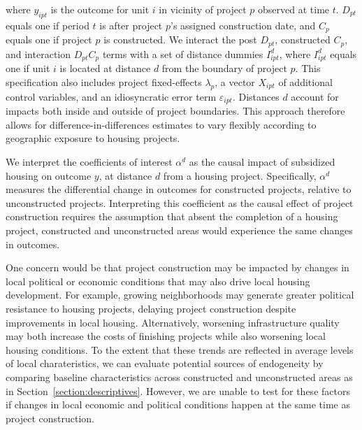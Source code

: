 \documentclass[12pt]{article}
\begin{document}
\noindent where $y_{ipt}$ is the outcome for unit $i$ in vicinity of project $p$ observed at time $t$. $D_{pt}$ equals one if period $t$ is after project $p$'s assigned construction date, and $C_{p}$ equals one if project $p$ is constructed. We interact the post $D_{pt}$, constructed $C_{p}$, and interaction $D_{pt}C_{p}$ terms with a set of distance dummies $I^d_{ipt}$, where $I^d_{ipt}$ equals one if unit $i$ is located at distance $d$ from the boundary of project $p$. This specification also includes project fixed-effects $\lambda_p$, a vector $X_{ipt}$ of additional control variables, and an idiosyncratic error term $\varepsilon_{ipt}$.  Distances $d$ account for impacts both inside and outside of project boundaries. This approach therefore allows for difference-in-differences estimates to vary flexibly according to geographic exposure to housing projects.

We interpret the coefficients of interest $\alpha^d$ as the causal impact of subsidized housing on outcome $y$, at distance $d$ from a housing project. Specifically, $\alpha^d$ measures the differential change in outcomes for constructed projects, relative to unconstructed projects.  Interpreting this coefficient as the causal effect of project construction requires the assumption that absent the completion of a housing project, constructed and unconstructed areas would experience the same changes in outcomes.  

One concern would be that project construction may be impacted by changes in local political or economic conditions that may also drive local housing development.  For example, growing neighborhoods may generate greater political resistance to housing projects, delaying project construction despite improvements in local housing.  Alternatively, worsening infrastructure quality may both increase the costs of finishing projects while also worsening local housing conditions.  To the extent that these trends are reflected in average levels of local charateristics, we can evaluate potential sources of endogeneity by comparing baseline characteristics across constructed and unconstructed areas as in Section~\ref{section:descriptives}.  However, we are unable to test for these factors if changes in local economic and political conditions happen at the same time as project construction.
\end{document}
